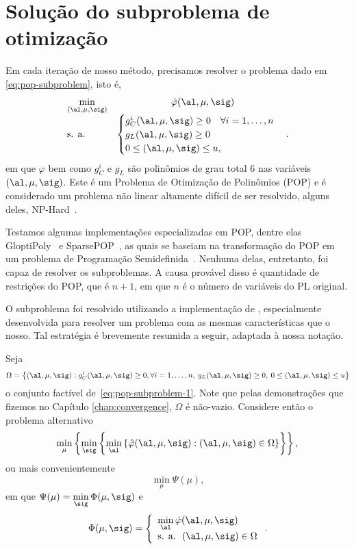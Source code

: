 \section{Solução do subproblema de otimização}

Em cada iteração de nosso método, precisamos resolver o problema dado em \eqref{eq:pop-subproblem}, isto é, 
\begin{equation}
	\label{eq:pop-subproblem-1}
	\begin{array}{lc}
\displaystyle \min_{(\al,\mu,\sig)} & \hat\varphi(\al,\mu,\sig) \\
\text{s. a.} &\begin{cases} g_C^i(\al,\mu,\sig) \geq 0 \quad \forall i = 1,\ldots,n \\
				g_L(\al,\mu,\sig)   \geq 0 	\\
				 0\leq (\al,\mu,\sig) \leq u,
				 	
				 \end{cases}.
\end{array}
\end{equation}
em que $\varphi$ bem como $g_{C}^{i}$ e $g_{L}$ são polinômios de grau total 6 nas variáveis $(\al,\mu,\sig)$. Este é um  Problema de Otimização de Polinômios (POP) e é considerado um problema não linear altamente  difícil de ser resolvido, alguns deles, NP-Hard~\cite{Laurent:2010kp,Lasserre:2001fw,Nesterov:2000ch}.

Testamos algumas  implementações especializadas em POP, dentre elas GloptiPoly~\cite{Henrion:2009eb} e SparsePOP~\cite{Waki:2008ie}, as quais se baseiam na transformação do POP em um problema de Programação Semidefinida~\cite{Lasserre:2001fw}. Nenhuma delas, entretanto, foi capaz de resolver os subproblemas. A causa provável disso é  quantidade de restrições do POP, que é  $n+1$, em que $n$ é o número de variáveis do PL original.


O subproblema foi resolvido utilizando a implementação de \textcite{VillasBoas:2012ur,VillasBoas2013:wn}, especialmente desenvolvida para resolver um problema com as mesmas características que o nosso.  Tal estratégia é brevemente resumida a seguir, adaptada à nossa notação.

Seja
\[\Omega = \left\{(\al,\mu,\sig): g_C^i(\al,\mu,\sig) \geq0, \forall i = 1,\ldots,n,\: g_L(\al,\mu,\sig)   \geq 0,\:		 0\leq (\al,\mu,\sig) \leq u\right\}\]
o conjunto factível de~\eqref{eq:pop-subproblem-1}. Note que pelas demonstrações que fizemos no Capítulo \ref{chap:convergence}, $\Omega$ é não-vazio. Considere então o problema alternativo
\begin{equation}
		\label{eq:pop-subproblem-2}
\displaystyle  \min_{\mu}\left\{  \min_{\sig} \left\{ \min_{\al} \left\{ \nextphi(\al,\mu,\sig):    (\al,\mu,\sig) \in \Omega  \right\} \right\}\right\}, \\
\end{equation}
ou mais convenientemente 
\[
\displaystyle \min_{\mu}\Psi(\mu),
\]
em que  $\displaystyle \Psi (\mu)= \min_{\sig}\Phi(\mu,\sig)$ e 
\[
\Phi(\mu,\sig) = \left\{
	\begin{array}{l}
\displaystyle \min_{\al}  \nextphi(\al,\mu,\sig) \\
\text{s. a. }\:  (\al,\mu,\sig) \in\Omega
\end{array}\right..
\]
  
